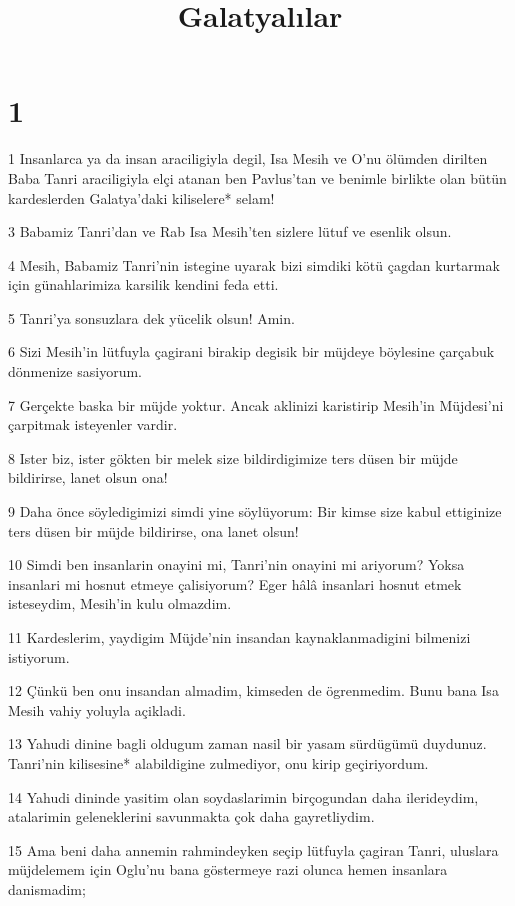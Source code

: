 

\title{Galatyalılar}


\chapter{1}

\par 1 Insanlarca ya da insan araciligiyla degil, Isa Mesih ve O'nu ölümden dirilten Baba Tanri araciligiyla elçi atanan ben Pavlus'tan ve benimle birlikte olan bütün kardeslerden Galatya'daki kiliselere* selam!
\par 3 Babamiz Tanri'dan ve Rab Isa Mesih'ten sizlere lütuf ve esenlik olsun.
\par 4 Mesih, Babamiz Tanri'nin istegine uyarak bizi simdiki kötü çagdan kurtarmak için günahlarimiza karsilik kendini feda etti.
\par 5 Tanri'ya sonsuzlara dek yücelik olsun! Amin.
\par 6 Sizi Mesih'in lütfuyla çagirani birakip degisik bir müjdeye böylesine çarçabuk dönmenize sasiyorum.
\par 7 Gerçekte baska bir müjde yoktur. Ancak aklinizi karistirip Mesih'in Müjdesi'ni çarpitmak isteyenler vardir.
\par 8 Ister biz, ister gökten bir melek size bildirdigimize ters düsen bir müjde bildirirse, lanet olsun ona!
\par 9 Daha önce söyledigimizi simdi yine söylüyorum: Bir kimse size kabul ettiginize ters düsen bir müjde bildirirse, ona lanet olsun!
\par 10 Simdi ben insanlarin onayini mi, Tanri'nin onayini mi ariyorum? Yoksa insanlari mi hosnut etmeye çalisiyorum? Eger hâlâ insanlari hosnut etmek isteseydim, Mesih'in kulu olmazdim.
\par 11 Kardeslerim, yaydigim Müjde'nin insandan kaynaklanmadigini bilmenizi istiyorum.
\par 12 Çünkü ben onu insandan almadim, kimseden de ögrenmedim. Bunu bana Isa Mesih vahiy yoluyla açikladi.
\par 13 Yahudi dinine bagli oldugum zaman nasil bir yasam sürdügümü duydunuz. Tanri'nin kilisesine* alabildigine zulmediyor, onu kirip geçiriyordum.
\par 14 Yahudi dininde yasitim olan soydaslarimin birçogundan daha ilerideydim, atalarimin geleneklerini savunmakta çok daha gayretliydim.
\par 15 Ama beni daha annemin rahmindeyken seçip lütfuyla çagiran Tanri, uluslara müjdelemem için Oglu'nu bana göstermeye razi olunca hemen insanlara danismadim;
